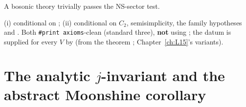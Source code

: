 \begin{physics}
A bosonic theory trivially passes the NS-sector test.
\end{physics}
\begin{status}
(i) conditional on ; (ii) conditional on $C_2$, semisimplicity, the family hypotheses and . Both
\texttt{\#print axioms}-clean (standard three), \textbf{not} using ; the datum  is supplied for every $V$ by
 (from the theorem ; Chapter~\ref{ch:L15}'s  variants).
\end{status}

\section{The analytic \texorpdfstring{$j$}{j}-invariant and the abstract Moonshine corollary}\label{l14:sec:moonshine}

